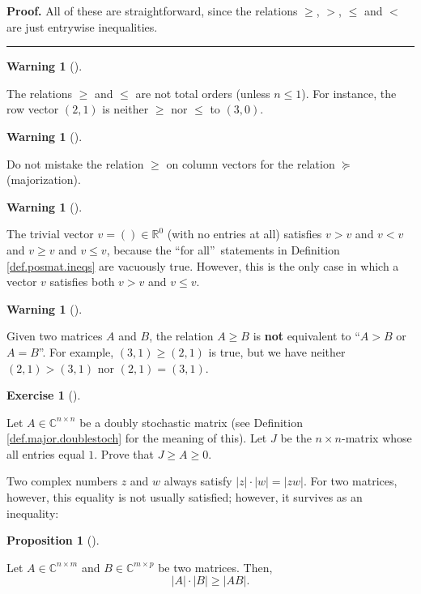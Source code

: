 \documentclass[numbers=enddot,12pt,final,onecolumn,notitlepage]{scrartcl}%
\newcounter{exer}
\numberwithin{exer}{subsection}
\theoremstyle{definition}
\newtheorem{prop}[theo]{Proposition}
\newenvironment{proposition}[1][]
{\begin{prop}[#1]\begin{leftbar}}
{\end{leftbar}\end{prop}}
\newtheorem{warn}[theo]{Warning}
\newenvironment{warning}[1][]
{\begin{warn}[#1]\begin{leftbar}}
{\end{leftbar}\end{warn}}
\newtheorem{exmp}[exer]{Exercise}
\newenvironment{exercise}[1][]
{\begin{exmp}[#1]\begin{leftbar}}
{\end{leftbar}\end{exmp}}
\newenvironment{proof}[1][Proof]{\noindent\textbf{#1.} }{\ \rule{0.5em}{0.5em}}
\newenvironment{warning}[1][Warning]{\noindent\textbf{#1.} }{\ \rule{0.5em}{0.5em}}
\begin{document}
\begin{proof}
All of these are straightforward, since the relations $\geq$, $>$, $\leq$ and
$<$ are just entrywise inequalities.
\end{proof}

\begin{warning}
The relations $\geq$ and $\leq$ are not total orders (unless $n\leq1$). For
instance, the row vector $\left(  2,1\right)  $ is neither $\geq$ nor $\leq$
to $\left(  3,0\right)  $.
\end{warning}

\begin{warning}
Do not mistake the relation $\geq$ on column vectors for the relation
$\succcurlyeq$ (majorization).
\end{warning}

\begin{warning}
The trivial vector $v=\left(  {}\right)  \in\mathbb{R}^{0}$ (with no entries
at all) satisfies $v>v$ and $v<v$ and $v\geq v$ and $v\leq v$, because the
\textquotedblleft for all\textquotedblright\ statements in Definition
\ref{def.posmat.ineqs} are vacuously true. However, this is the only case in
which a vector $v$ satisfies both $v>v$ and $v\leq v$.
\end{warning}

\begin{warning}
Given two matrices $A$ and $B$, the relation $A\geq B$ is \textbf{not}
equivalent to \textquotedblleft$A>B$ or $A=B$\textquotedblright. For example,
$\left(  3,1\right)  \geq\left(  2,1\right)  $ is true, but we have neither
$\left(  2,1\right)  >\left(  3,1\right)  $ nor $\left(  2,1\right)  =\left(
3,1\right)  $.
\end{warning}

\begin{exercise}
 Let $A\in\mathbb{C}^{n\times n}$ be a doubly stochastic matrix (see
Definition \ref{def.major.doublestoch} for the meaning of this). Let $J$ be
the $n\times n$-matrix whose all entries equal $1$. Prove that $J\geq A\geq0$.
\end{exercise}

Two complex numbers $z$ and $w$ always satisfy $\left\vert z\right\vert
\cdot\left\vert w\right\vert =\left\vert zw\right\vert $. For two matrices,
however, this equality is not usually satisfied; however, it survives as an inequality:

\begin{proposition}
\label{prop.posmat.prod-geq}Let $A\in\mathbb{C}^{n\times m}$ and
$B\in\mathbb{C}^{m\times p}$ be two matrices. Then,%
\[
\left\vert A\right\vert \cdot\left\vert B\right\vert \geq\left\vert
AB\right\vert .
\]

\end{proposition}
\end{document}
